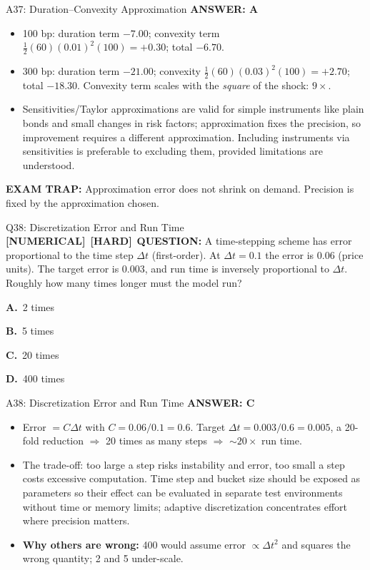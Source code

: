 \documentclass[8pt]{beamer}
\newcommand{\fs}{\fontsize{10}{12}\selectfont}
\newcommand{\opts}[4]{\par\vspace{0.12cm}\noindent\textbf{A.}~#1\par\vspace{0.08cm}\noindent\textbf{B.}~#2\par\vspace{0.08cm}\noindent\textbf{C.}~#3\par\vspace{0.08cm}\noindent\textbf{D.}~#4\par}
\newcommand{\ans}[1]{\textcolor{myblue}{\textbf{ANSWER: #1}}}
\newcommand{\trap}[1]{\textcolor{myred}{\textbf{EXAM TRAP:}} #1}
\newcommand{\numtag}{\textcolor{mypurple}{\textbf{[NUMERICAL]}}}
\newcommand{\hard}{\textcolor{myorange}{\textbf{[HARD]}}}
\begin{document}
\begin{frame}[t]{A37: Duration--Convexity Approximation}
\fs
\ans{A}
\begin{itemize}
\item 100 bp: duration term $-7.00$; convexity term $\tfrac12(60)(0.01)^2(100)=+0.30$; total $-6.70$.
\item 300 bp: duration term $-21.00$; convexity $\tfrac12(60)(0.03)^2(100)=+2.70$; total $-18.30$. Convexity term scales with the \emph{square} of the shock: $9\times$.
\item Sensitivities/Taylor approximations are valid for simple instruments like plain bonds and small changes in risk factors; approximation fixes the precision, so improvement requires a different approximation. Including instruments via sensitivities is preferable to excluding them, provided limitations are understood.
\end{itemize}
\trap{Approximation error does not shrink on demand. Precision is \textcolor{myblue}{fixed} by the approximation chosen.}
\end{frame}

\begin{frame}[t]{Q38: Discretization Error and Run Time}
\fs
\numtag\ \hard\ \textbf{QUESTION:} A time-stepping scheme has error proportional to the time step $\Delta t$ (first-order). At $\Delta t=0.1$ the error is 0.06 (price units). The target error is 0.003, and run time is inversely proportional to $\Delta t$. Roughly how many times longer must the model run?
\opts{2 times}{5 times}{20 times}{400 times}
\end{frame}

\begin{frame}[t]{A38: Discretization Error and Run Time}
\fs
\ans{C}
\begin{itemize}
\item Error $=C\Delta t$ with $C=0.06/0.1=0.6$. Target $\Delta t=0.003/0.6=0.005$, a 20-fold reduction $\Rightarrow$ 20 times as many steps $\Rightarrow$ $\sim20\times$ run time.
\item The trade-off: too large a step risks instability and error, too small a step costs excessive computation. Time step and bucket size should be exposed as parameters so their effect can be evaluated in separate test environments without time or memory limits; adaptive discretization concentrates effort where precision matters.
\item \textbf{Why others are wrong:} 400 would assume error $\propto\Delta t^{2}$ and squares the wrong quantity; 2 and 5 under-scale.
\end{itemize}
\end{frame}
\end{document}
